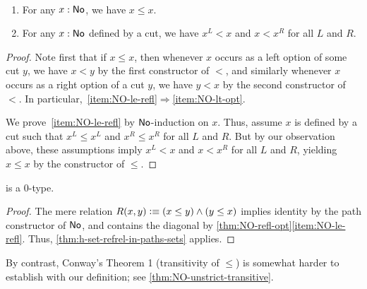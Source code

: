 \begin{thm}\label{thm:NO-refl-opt}\ 
  \begin{enumerate}
  \item For any $x:\mathsf{No}$, we have $x\le x$.\label{item:NO-le-refl}
  \item For any $x:\mathsf{No}$ defined by a cut, we have $x^L <x$ and $x<x^R$ for all $L$ and $R$.\label{item:NO-lt-opt}
  \end{enumerate}
\end{thm}
\begin{proof}
  Note first that if $x\le x$, then whenever $x$ occurs as a left option of some cut $y$, we have $x<y$ by the first constructor of $<$, and similarly whenever $x$ occurs as a right option of a cut $y$, we have $y<x$ by the second constructor of $<$.
  In particular,~\ref{item:NO-le-refl}$\Rightarrow$\ref{item:NO-lt-opt}.

  We prove~\ref{item:NO-le-refl} by $\mathsf{No}$-induction on $x$.
  Thus, assume $x$ is defined by a cut such that $x^L\le x^L$ and $x^R \le x^R$ for all $L$ and $R$.
  But by our observation above, these assumptions imply $x^L<x$ and $x<x^R$ for all $L$ and $R$, yielding $x\le x$ by the constructor of $\le$.
\end{proof}

\begin{cor}\label{thm:NO-set}
  \NO is a 0-type.
\end{cor}
\begin{proof}
  The mere relation $R(x,y)\vcentcolon\equiv (x\le y) \land (y\le x)$ implies identity by the path constructor of $\mathsf{No}$, and contains the diagonal by \autoref{thm:NO-refl-opt}\ref{item:NO-le-refl}.
  Thus, \autoref{thm:h-set-refrel-in-paths-sets} applies.
\end{proof}

By contrast, Conway's Theorem 1 (transitivity of $\le$) is somewhat harder to establish with our definition; see \autoref{thm:NO-unstrict-transitive}.



